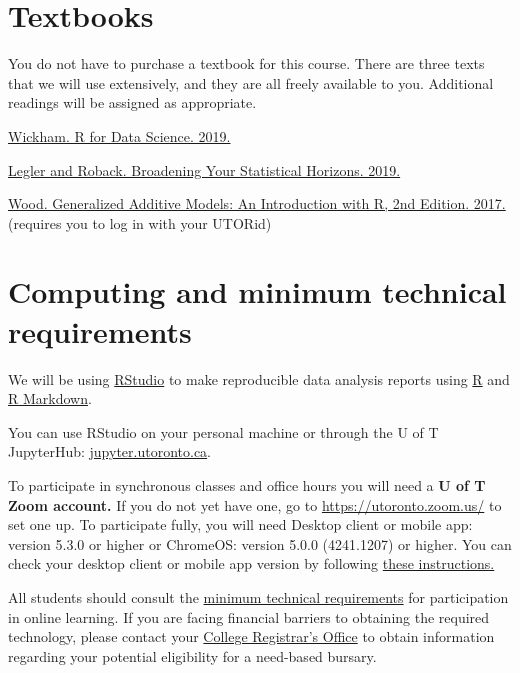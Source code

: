 \documentclass[
  openany]{book}
\begin{document}
\hypertarget{textbooks}{%
\section{Textbooks}\label{textbooks}}

You do not have to purchase a textbook for this course. There are three texts that we will use extensively, and they are all freely available to you. Additional readings will be assigned as appropriate.

\href{https://r4ds.had.co.nz}{Wickham. R for Data Science. 2019.}

\href{https://bookdown.org/roback/bookdown-bysh/}{Legler and Roback. Broadening Your Statistical Horizons. 2019.}

\href{https://ebookcentral-proquest-com.myaccess.library.utoronto.ca/lib/utoronto/detail.action?docID=4862399}{Wood. Generalized Additive Models: An Introduction with R, 2nd Edition. 2017.} (requires you to log in with your UTORid)

\hypertarget{computing-and-minimum-technical-requirements}{%
\section{Computing and minimum technical requirements}\label{computing-and-minimum-technical-requirements}}

We will be using \href{https://www.rstudio.com/}{RStudio} to make reproducible data analysis reports using \href{https://www.r-project.org/}{R} and \href{http://rmarkdown.rstudio.com/}{R Markdown}.

You can use RStudio on your personal machine or through the U of T JupyterHub: \href{https://jupyter.utoronto.ca/}{jupyter.utoronto.ca}.

To participate in synchronous classes and office hours you will need a \textbf{U of T Zoom account.} If you do not yet have one, go to \url{https://utoronto.zoom.us/} to set one up. To participate fully, you will need Desktop client or mobile app: version 5.3.0 or higher or ChromeOS: version 5.0.0 (4241.1207) or higher. You can check your desktop client or mobile app version by following \href{https://support.zoom.us/hc/en-us/articles/201362393-Viewing-the-Zoom-version-number}{these instructions.}

All students should consult the \href{https://www.viceprovoststudents.utoronto.ca/covid-19/tech-requirements-online-learning/}{minimum technical requirements} for participation in online learning. If you are facing financial barriers to obtaining the required technology, please contact your \href{https://www.artsci.utoronto.ca/current/academic-advising-and-support/college-registrars-offices}{College Registrar's Office} to obtain information regarding your potential eligibility for a need-based bursary.
\end{document}
